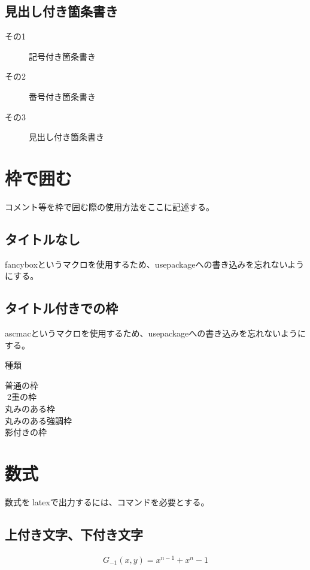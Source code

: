 \documentclass[11pt, oneside]{article}   	%
\begin{document}
\subsection{見出し付き箇条書き}
\begin{description}
\item[その1] 記号付き箇条書き
\item[その2] 番号付き箇条書き
\item[その3] 見出し付き箇条書き
\end{description}

\section{枠で囲む}
コメント等を枠で囲む際の使用方法をここに記述する。
\subsection{タイトルなし}
fancyboxというマクロを使用するため、usepackageへの書き込みを忘れないようにする。

\subsection{タイトル付きでの枠}
ascmacというマクロを使用するため、usepackageへの書き込みを忘れないようにする。
\begin{itembox}{種類}
\begin{center}
普通の枠\\
2重の枠\\
丸みのある枠\\
丸みのある強調枠\\
影付きの枠
\end{center}
\end{itembox}

\section{数式}
数式をlatexで出力するには、コマンドを必要とする。
\subsection{上付き文字、下付き文字}
\begin{eqnarray}
    G_{-1}(x,y)=x^{n-1}+x^n-1
\end{eqnarray}
\end{document}
